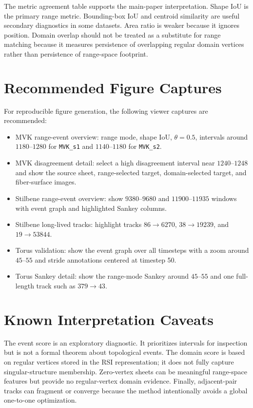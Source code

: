 \documentclass{vgtc}
\begin{document}
The metric agreement table supports the main-paper interpretation. Shape IoU is the primary range metric. Bounding-box IoU and centroid similarity are useful secondary diagnostics in some datasets. Area ratio is weaker because it ignores position. Domain overlap should not be treated as a substitute for range matching because it measures persistence of overlapping regular domain vertices rather than persistence of range-space footprint.

\section{Recommended Figure Captures}

For reproducible figure generation, the following viewer captures are recommended:
\begin{itemize}[leftmargin=*]
  \item MVK range-event overview: range mode, shape IoU, $\theta=0.5$, intervals around $1180$--$1280$ for \texttt{MVK\_s1} and $1140$--$1180$ for \texttt{MVK\_s2}.
  \item MVK disagreement detail: select a high disagreement interval near $1240$--$1248$ and show the source sheet, range-selected target, domain-selected target, and fiber-surface images.
  \item Stilbene range-event overview: show $9380$--$9680$ and $11900$--$11935$ windows with event graph and highlighted Sankey columns.
  \item Stilbene long-lived tracks: highlight tracks $86\rightarrow6270$, $38\rightarrow19239$, and $19\rightarrow53844$.
  \item Torus validation: show the event graph over all timesteps with a zoom around $45$--$55$ and stride annotations centered at timestep 50.
  \item Torus Sankey detail: show the range-mode Sankey around $45$--$55$ and one full-length track such as $379\rightarrow43$.
\end{itemize}

\section{Known Interpretation Caveats}

The event score is an exploratory diagnostic. It prioritizes intervals for inspection but is not a formal theorem about topological events. The domain score is based on regular vertices stored in the RSI representation; it does not fully capture singular-structure membership. Zero-vertex sheets can be meaningful range-space features but provide no regular-vertex domain evidence. Finally, adjacent-pair tracks can fragment or converge because the method intentionally avoids a global one-to-one optimization.



\end{document}

